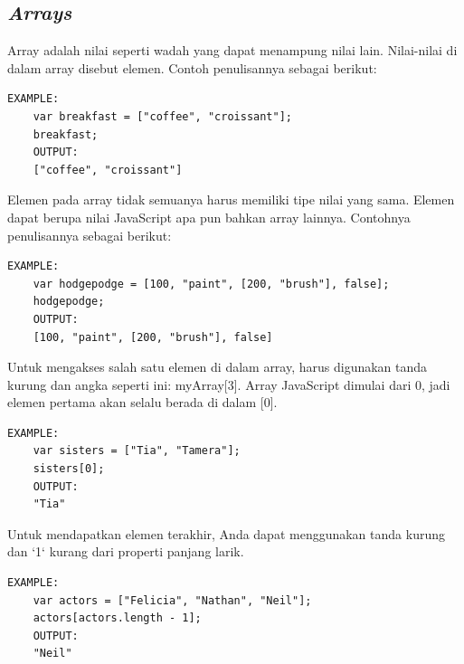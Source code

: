 \subsection{\textit{Arrays}}
\label{sec: Arrays}
Array adalah nilai seperti wadah yang dapat menampung nilai lain\cite{javascriptlearn}. Nilai-nilai di dalam array disebut elemen. Contoh penulisannya sebagai berikut: 
    \begin{lstlisting}[basicstyle=\ttfamily, frame=single,
    columns=fullflexible, breaklines=true, numbers=none]
    EXAMPLE:
    var breakfast = ["coffee", "croissant"];
    breakfast;
    OUTPUT:
    ["coffee", "croissant"]
    \end{lstlisting}
    Elemen pada array tidak semuanya harus memiliki tipe nilai yang sama. Elemen dapat berupa nilai JavaScript apa pun bahkan array lainnya. Contohnya penulisannya sebagai berikut: 
        \begin{lstlisting}[basicstyle=\ttfamily, frame=single,
    columns=fullflexible, breaklines=true, numbers=none]
    EXAMPLE:
    var hodgepodge = [100, "paint", [200, "brush"], false];
    hodgepodge;
    OUTPUT:
    [100, "paint", [200, "brush"], false]
    \end{lstlisting}
    Untuk mengakses salah satu elemen di dalam array, harus digunakan tanda kurung dan angka seperti ini: myArray[3]. Array JavaScript dimulai dari 0, jadi elemen pertama akan selalu berada di dalam [0].
    \begin{lstlisting}[basicstyle=\ttfamily, frame=single,
    columns=fullflexible, breaklines=true, numbers=none]
    EXAMPLE:
    var sisters = ["Tia", "Tamera"];
    sisters[0];
    OUTPUT:
    "Tia"
    \end{lstlisting}
    Untuk mendapatkan elemen terakhir, Anda dapat menggunakan tanda kurung dan `1` kurang dari properti panjang larik.
    \begin{lstlisting}[basicstyle=\ttfamily, frame=single,
    columns=fullflexible, breaklines=true, numbers=none]
    EXAMPLE:
    var actors = ["Felicia", "Nathan", "Neil"];
    actors[actors.length - 1];
    OUTPUT:
    "Neil"
    \end{lstlisting}
    
